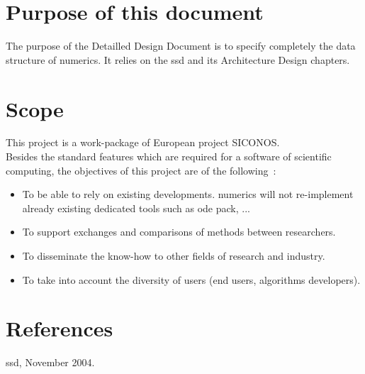 \section{Purpose of this document}
\label{Sec:DDD-Purpose}
The purpose of the Detailled Design Document is to specify completely the data structure of \ac{numerics}. It relies on the \ac{ssd} and its Architecture Design chapters.\\

\section{Scope}
\label{Sec:DDD-Scope}

This project is a work-package of European project \ac{SICONOS}. \\
Besides the standard features which are required for a software of scientific computing, the objectives of this project are of the following~:
\begin{itemize}
\item To be able to rely on existing developments. \ac{numerics} will not re-implement already existing dedicated tools such as \ac{ode} pack, ...
\item To support exchanges and comparisons of methods between researchers.
\item To disseminate the know-how to other fields of research and industry.
\item To take into account the diversity of users (end users, algorithms developers).
\end{itemize}

\section{References}
\label{Sec:DDD-References}

\ac{ssd}, November 2004.
